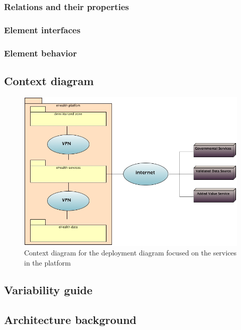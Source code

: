 \documentclass[a4paper,10pt]{article}
\begin{document}
\subsubsection{Relations and their properties}

\subsubsection{Element interfaces}

\subsubsection{Element behavior}

\subsection{Context diagram}
\begin{center}
    \begin{figure}[!h]
      \includegraphics[width=\textwidth]{../images/deployment_services_context.jpg}
	\caption{Context diagram for the deployment diagram focused on the services in the platform}
    \end{figure}
  \end{center}

\subsection{Variability guide}

\subsection{Architecture background}
\label{subsec:arch_back_dep_serv}
\end{document}
